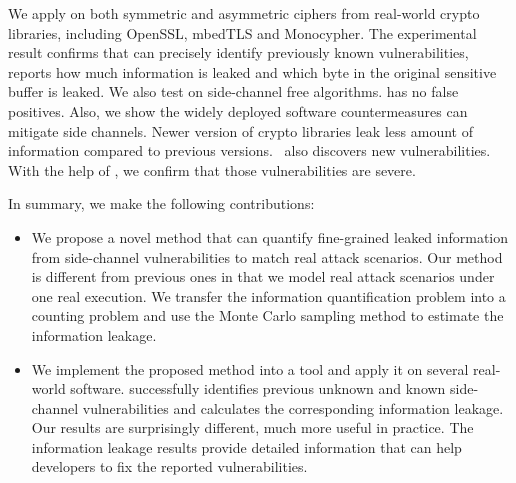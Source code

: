 We apply \tool{} on both symmetric and asymmetric ciphers from real-world crypto
libraries, including OpenSSL, mbedTLS and Monocypher\@. The experimental result confirms
that \tool{} can precisely identify previously known vulnerabilities, reports
how much information is leaked and which byte in the original sensitive buffer
is leaked. We also test \tool{} on side-channel free algorithms. \tool{} has no
false positives.
Also, we show the widely deployed software countermeasures can mitigate side channels.
Newer version of crypto libraries leak less amount of information 
compared to previous versions.
\tool\ also discovers new vulnerabilities. With the help of \tool{}, we confirm
that those vulnerabilities are severe.

In summary, we make the following contributions:

\begin{itemize}
      \item We propose a novel method that can quantify fine-grained leaked
            information from side-channel vulnerabilities to match real attack
            scenarios. Our method is different from previous ones in that we
            model real attack scenarios under one real execution. 
            We transfer the information quantification problem into a counting
            problem and use the Monte Carlo sampling method to estimate the
            information leakage.
   
      \item We implement the proposed method into a tool and apply it
            on several real-world software. \tool{} successfully identifies
            previous unknown and known side-channel vulnerabilities and calculates the
            corresponding information leakage. 
            Our results are surprisingly different, much more useful in practice.
            The information leakage results
            provide detailed information that can help developers to fix the
            reported vulnerabilities.
\end{itemize}
